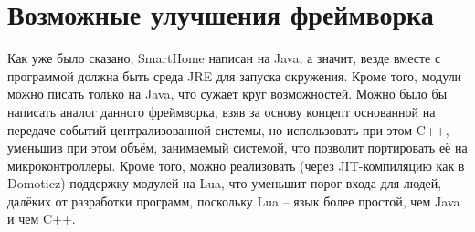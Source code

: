 \section{Возможные улучшения фреймворка}

Как уже было сказано, SmartHome написан на Java, а значит, везде вместе с программой должна быть среда JRE для запуска окружения.
Кроме того, модули можно писать только на Java, что сужает круг возможностей.
Можно было бы написать аналог данного фреймворка, взяв за основу концепт основанной на передаче событий централизованной системы,
но использовать при этом C++, уменьшив при этом объём, занимаемый системой, что позволит портировать её на микроконтроллеры.
Кроме того, можно реализовать (через JIT-компиляцию как в Domoticz) поддержку модулей на Lua, что уменьшит порог входа для людей, далёких от разработки программ, поскольку
Lua -- язык более простой, чем Java и чем C++.
